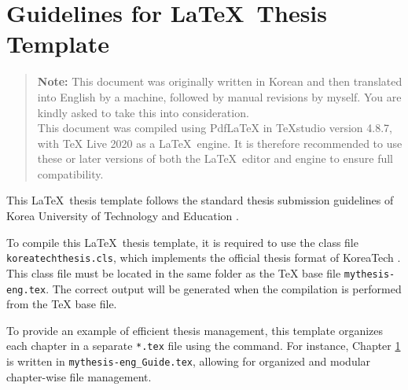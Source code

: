 
\chapter{Guidelines for \LaTeX~Thesis Template}	\label{chap:Guide}

\begin{quote}
	{\bf Note:} 
	This document was originally written in Korean and then translated into English by a machine, followed by manual revisions by myself. 
	You are kindly asked to take this into consideration.\\
	This document was compiled using PdfLaTeX in TeXstudio version 4.8.7, with TeX Live 2020 as a \LaTeX~engine. 
	It is therefore recommended to use these or later versions of both the \LaTeX~editor and engine to ensure full compatibility.
\end{quote}

This \LaTeX~thesis template follows the standard thesis submission guidelines of Korea University of Technology and Education \cite{ThesisGuide}.

To compile this \LaTeX~thesis template, it is required to use the class file \verb|koreatechthesis.cls|, which implements the official thesis format of KoreaTech \cite{ThesisTemplate}.
This class file must be located in the same folder as the TeX base file \verb|mythesis-eng.tex|. 
The correct output will be generated when the compilation is performed from the TeX base file.

To provide an example of efficient thesis management, this template organizes each chapter in a separate \verb|*.tex| file using the \verb|| command.
For instance, Chapter \ref{chap:Guide} is written in \verb|mythesis-eng_Guide.tex|, allowing for organized and modular chapter-wise file management. 



